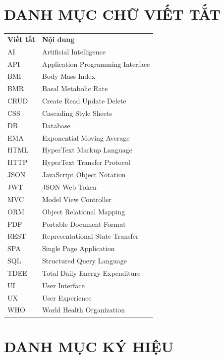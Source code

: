 \documentclass[12pt, a4paper]{report}
\begin{document}
\chapter*{DANH MỤC CHỮ VIẾT TẮT}

\noindent
\begin{tabular}{>{\raggedright\arraybackslash}p{3cm} p{11cm}}
\textbf{Viết tắt} & \textbf{Nội dung} \\[0.2cm]
AI & Artificial Intelligence \\[0.15cm]
API & Application Programming Interface \\[0.15cm]
BMI & Body Mass Index \\[0.15cm]
BMR & Basal Metabolic Rate \\[0.15cm]
CRUD & Create Read Update Delete \\[0.15cm]
CSS & Cascading Style Sheets \\[0.15cm]
DB & Database \\[0.15cm]
EMA & Exponential Moving Average \\[0.15cm]
HTML & HyperText Markup Language \\[0.15cm]
HTTP & HyperText Transfer Protocol \\[0.15cm]
JSON & JavaScript Object Notation \\[0.15cm]
JWT & JSON Web Token \\[0.15cm]
MVC & Model View Controller \\[0.15cm]
ORM & Object Relational Mapping \\[0.15cm]
PDF & Portable Document Format \\[0.15cm]
REST & Representational State Transfer \\[0.15cm]
SPA & Single Page Application \\[0.15cm]
SQL & Structured Query Language \\[0.15cm]
TDEE & Total Daily Energy Expenditure \\[0.15cm]
UI & User Interface \\[0.15cm]
UX & User Experience \\[0.15cm]
WHO & World Health Organization \\
\end{tabular}
\clearpage

\chapter*{DANH MỤC KÝ HIỆU}
\end{document}
